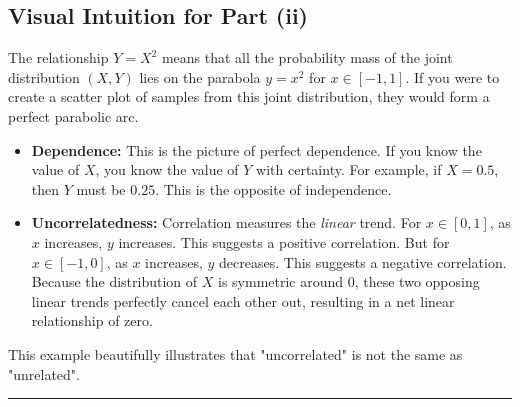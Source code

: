\documentclass[11pt,a4paper]{article}
\begin{document}
\subsection{Visual Intuition for Part (ii)}
The relationship $Y=X^2$ means that all the probability mass of the joint distribution $(X,Y)$ lies on the parabola $y=x^2$ for $x \in [-1,1]$. If you were to create a scatter plot of samples from this joint distribution, they would form a perfect parabolic arc.
\begin{itemize}
    \item \textbf{Dependence:} This is the picture of perfect dependence. If you know the value of $X$, you know the value of $Y$ with certainty. For example, if $X=0.5$, then $Y$ must be $0.25$. This is the opposite of independence.
    \item \textbf{Uncorrelatedness:} Correlation measures the \emph{linear} trend. For $x \in [0, 1]$, as $x$ increases, $y$ increases. This suggests a positive correlation. But for $x \in [-1, 0]$, as $x$ increases, $y$ decreases. This suggests a negative correlation. Because the distribution of $X$ is symmetric around 0, these two opposing linear trends perfectly cancel each other out, resulting in a net linear relationship of zero.
\end{itemize}
This example beautifully illustrates that "uncorrelated" is not the same as "unrelated".

\vfill
\hrule
\end{document}
